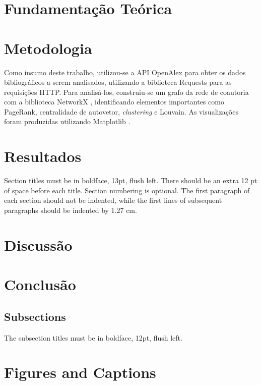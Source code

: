 \documentclass[12pt]{article}
\begin{document}
\section{Fundamentação Teórica}
\label{sec:fundamentacao}

\section{Metodologia}
\label{sec:metodologia}

Como insumo deste trabalho, utilizou-se a API OpenAlex \cite{OpenAlex2026} para obter os dados bibliográficos a serem analisados, utilizando a biblioteca Requests \cite{Requests2026} para as requisições HTTP. Para analisá-los, construiu-se um grafo da rede de coautoria com a biblioteca NetworkX \cite{NetworkX2026}, identificando elementos importantes como PageRank, centralidade de autovetor, \textit{clustering} e Louvain. As visualizações foram produzidas utilizando Matplotlib \cite{MDT2026}.

\section{Resultados}
\label{sec:resultados}

Section titles must be in boldface, 13pt, flush left. There should be an extra
12 pt of space before each title. Section numbering is optional. The first
paragraph of each section should not be indented, while the first lines of
subsequent paragraphs should be indented by 1.27 cm.

\section{Discussão}
\label{sec:discussao}

\section{Conclusão}
\label{sec:conclusao}


\subsection{Subsections}

The subsection titles must be in boldface, 12pt, flush left.

\section{Figures and Captions}\label{sec:figs}
\end{document}
